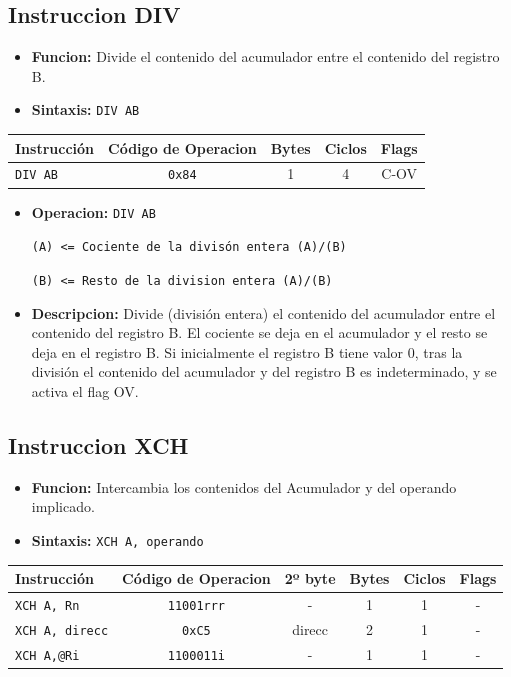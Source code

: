 \documentclass[doc, donotrepeattitle, biblatex, apacite]{apa6}
\begin{document}
\subsection{Instruccion DIV}
\begin{itemize}
\item \textbf{Funcion:} Divide el contenido del acumulador entre el contenido del registro B.
\item \textbf{Sintaxis:} \texttt{DIV AB}
\end{itemize}

\begin{center}
	\begin{tabular}{|l|c|c|c|c|}
		\hline
		Instrucción & Código de Operacion & Bytes & Ciclos & Flags
		\\ \hline
		\texttt{DIV AB} & \texttt{0x84} & 1 & 4 & C-OV
		\\ \hline
	\end{tabular}
\end{center}

\begin{itemize}
\item \textbf{Operacion:} \texttt{DIV AB}

\texttt{(A) <= Cociente de la divisón entera (A)/(B)}

\texttt{(B) <= Resto de la division entera (A)/(B)}

\item \textbf{Descripcion:} Divide (división entera) el contenido del acumulador entre el contenido del registro B. El cociente se deja en el acumulador y el resto se deja en el registro B. Si inicialmente el registro B tiene valor 0, tras la división el contenido del acumulador y del registro B es indeterminado, y se activa el flag OV.
\end{itemize}

\newpage
\subsection{Instruccion XCH}
\begin{itemize}
\item \textbf{Funcion:} Intercambia los contenidos del Acumulador y del operando implicado.
\item \textbf{Sintaxis:} \texttt{XCH A, operando}
\end{itemize}

\begin{center}
	\begin{tabular}{|l|c|c|c|c|c|}
		\hline
		Instrucción & Código de Operacion & 2º byte & Bytes & Ciclos & Flags
		\\ \hline
		\texttt{XCH A, Rn} & \texttt{11001rrr} & - & 1 & 1 & -
		\\
		\texttt{XCH A, direcc} & \texttt{0xC5} & direcc & 2 & 1 & -
		\\
		\texttt{XCH A,@Ri} & \texttt{1100011i} & - & 1 & 1 & -
		\\ \hline
	\end{tabular}
\end{center}
\end{document}
